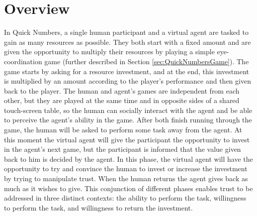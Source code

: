 \section{Overview}
\label{sec:ScenarioOverview}
In Quick Numbers, a single human participant and a virtual agent are tasked to gain as many resources as possible. They both start with a fixed amount and are given the opportunity to multiply their resources by playing a simple eye-coordination game (further described in Section \ref{sec:QuickNumbersGame}). The game starts by asking for a resource investment, and at the end, this investment is multiplied by an amount according to the player's performance and then given back to the player. The human and agent's games are independent from each other, but they are played at the same time and in opposite sides of a shared touch-screen table, so the human can socially interact with the agent and be able to perceive the agent's ability in the game. After both finish running through the game, the human will be asked to perform some task away from the agent. At this moment the virtual agent will give the participant the opportunity to invest in the agent's next game, but the participant is informed that the value given back to him is decided by the agent. In this phase, the virtual agent will have the opportunity to try and convince the human to invest or increase the investment by trying to manipulate trust. When the human returns the agent gives back as much as it wishes to give. This conjunction of different phases enables trust to be addressed in three distinct contexts: the ability to perform the task, willingness to perform the task, and willingness to return the investment. 


